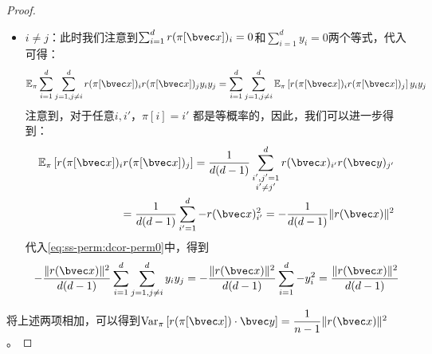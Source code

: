 \begin{proof}
\begin{itemize}
    \item $i \ne j$：此时我们注意到$\sum_{i=1}^d r(\pi[\bvec x])_i = 0$和$\sum_{i=1}^d y_i = 0$两个等式，代入可得：
    \begin{equation}
    \label{eq:ss-perm:dcor-perm0}
        \mathbb E_\pi \sum_{i=1}^d  \sum_{j = 1, j\ne i}^d r(\pi[\bvec x])_i r(\pi[\bvec x])_j y_i y_j = \sum_{i=1}^d  \sum_{j = 1, j\ne i}^d \mathbb E_\pi \left[ r(\pi[\bvec x])_i r(\pi[\bvec x])_j \right] y_i y_j
    \end{equation}
    注意到，对于任意$i, i'$，$\pi[i] = i'$ 都是等概率的，因此，我们可以进一步得到：
    \begin{equation}
    \begin{split}
        \mathbb E_\pi \left[ r(\pi[\bvec x])_i r(\pi[\bvec x])_j \right] = \dfrac{1}{d(d-1)}\sum_{\substack{i',j'=1\\i'\ne j'}}^d r(\bvec x)_{i'} r(\bvec y)_{j'} \\
        = \dfrac{1}{d(d-1)}\sum_{i'=1}^d -r(\bvec x)_{i'}^2  = -\dfrac{1}{d(d-1)}\Vert r(\bvec x) \Vert^2
    \end{split}
    \end{equation}
    代入\autoref{eq:ss-perm:dcor-perm0}中，得到
    \begin{equation}
        -\dfrac{\Vert r(\bvec x) \Vert^2 }{d(d-1)}\sum_{i=1}^d  \sum_{j = 1, j\ne i}^d y_i y_j = -\dfrac{\Vert r(\bvec x) \Vert^2 }{d(d-1)}\sum_{i=1}^d -y_i^2 = \dfrac{\Vert r(\bvec x) \Vert^2 }{d(d-1)}
    \end{equation}
\end{itemize}
将上述两项相加，可以得到$\text{Var}_\pi \left[ r(\pi[\bvec x])\cdot \bvec y \right] = \dfrac{1}{n - 1} \Vert r(\bvec x) \Vert^2$。
\end{proof}

